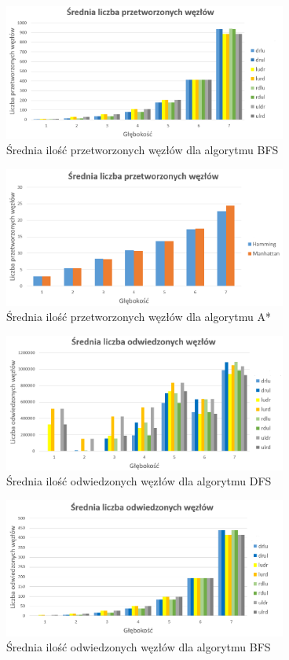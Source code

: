 \documentclass{classrep}
\begin{document}
\begin{figure}[h!]
    \centering
    \includegraphics[width=0.83\textwidth]{processedBFS.png}
    \caption{Średnia ilość przetworzonych węzłów dla algorytmu BFS}
	\label{processedBFS}
\end{figure}
\begin{figure}[h!]
    \centering
    \includegraphics[width=0.83\textwidth]{processedastar.png}
    \caption{Średnia ilość przetworzonych węzłów dla algorytmu A*}
	\label{processedastar}
\end{figure}
\begin{figure}[h!]
    \centering
    \includegraphics[width=0.83\textwidth]{visitedDFS.png}
    \caption{Średnia ilość odwiedzonych węzłów dla algorytmu DFS}
	\label{visitedDFS}
\end{figure}
\begin{figure}[h!]
    \centering
    \includegraphics[width=0.83\textwidth]{visitedBFS.png}
    \caption{Średnia ilość odwiedzonych węzłów dla algorytmu BFS}
	\label{visitedBFS}
\end{figure}
\end{document}
